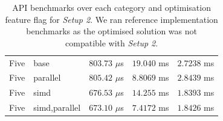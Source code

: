 \documentclass[11pt]{report}
\theoremstyle{definition}
\theoremstyle{plain}
\begin{document}
\begin{table}[H]
\begin{tabular}{l|l|lll}
    \arrayrulecolor{lightgray}\hline\arrayrulecolor{black}
    Five                           & base          & $803.73$ $\mu$s & $19.040$ ms & $2.7238$ ms     \\
    Five                           & parallel      & $805.42$ $\mu$s & $8.8069$ ms & $2.8439$ ms     \\
    Five                           & simd          & $676.53$ $\mu$s & $14.255$ ms & $1.8393$ ms     \\
    Five                           & simd,parallel & $673.10$ $\mu$s & $7.4172$ ms & $1.8426$ ms     \\
    \hline
  \end{tabular}
  \caption{API benchmarks over each category and optimisation feature flag for \textit{Setup 2}. We ran reference implementation benchmarks as the optimised solution was not compatible with \textit{Setup 2}.}
  \label{tab:api_mac_results}
\end{table}
\end{document}
